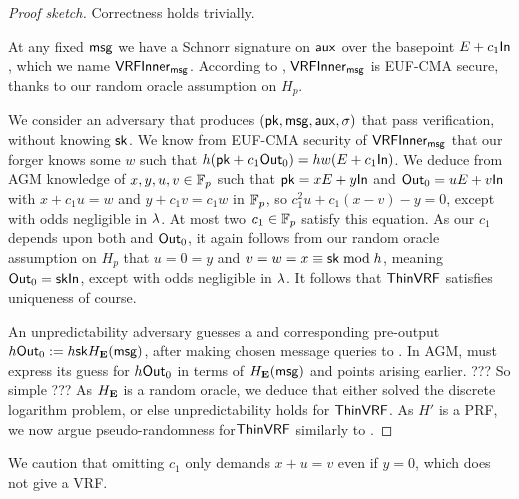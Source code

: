 \begin{proof}[Proof sketch]
Correctness holds trivially.

At any fixed $\mathsf{msg}$ we have a Schnorr signature on $\mathsf{aux}$
 over the basepoint $E + c_1 {\mathsf{In}}$, which we name ${\mathsf{VRFInner}}_{\mathsf{msg}}$.
According to \cite[\S5]{cryptoeprint:2020:823},
 ${\mathsf{VRFInner}}_{\mathsf{msg}}$ is EUF-CMA secure,
 thanks to our random oracle assumption on $H_p$.

We consider an adversary that produces $(\mathsf{pk},\mathsf{msg},\mathsf{aux},\sigma)$
 that pass verification, without knowing $\mathsf{sk}$.  
We know from EUF-CMA security of ${\mathsf{VRFInner}}_{\mathsf{msg}}$ that
our forger knows some $w$ such that
 $h (\mathsf{pk} + c_1 {\mathsf{Out}}_0) = h w (E + c_1 {\mathsf{In}})$.
We deduce from AGM knowledge of $x,y,u,v \in \mathbb{F}_p$ such that
 $\mathsf{pk} = x E + y {\mathsf{In}}$ and ${\mathsf{Out}}_0 = u E + v {\mathsf{In}}$
 with $x + c_1 u = w$ and $y + c_1 v = c_1 w$ in $\mathbb{F}_p$,
 so $c_1^2 u + c_1 (x-v) - y = 0$, except with odds negligible in $\lambda$.
At most two $c_1 \in \mathbb{F}_p$ satisfy this equation.
As our $c_1$ depends upon both \pk and ${\mathsf{Out}}_0$, 
it again follows from our random oracle assumption on $H_p$ that
 $u=0=y$ and $v = w = x \equiv \mathsf{sk} \bmod h$, meaning ${\mathsf{Out}}_0 = \mathsf{sk} {\mathsf{In}}$,
 except with odds negligible in $\lambda$.
It follows that ${\mathsf{ThinVRF}}$ satisfies uniqueness of course. 

An unpredictability adversary \adv guesses
 a \msg and corresponding pre-output $h {\mathsf{Out}}_0 := h \mathsf{sk} H_{\mathbf{E}}(\mathsf{msg})$,
after making chosen message queries to \Sign.
In AGM, \adv must express its guess for $h {\mathsf{Out}}_0$
 in terms of $H_{\mathbf{E}}(\mathsf{msg})$ and points arising earlier.
???  So simple ???
As $H_{\mathbf{E}}$ is a random oracle, we deduce that either
 \adv solved the discrete logarithm problem, or else
 unpredictability holds for ${\mathsf{ThinVRF}}$.
As $H'$ is a PRF, we now argue pseudo-randomness for${\mathsf{ThinVRF}}$ similarly
 to \cite[Proposition 1]{vrf_micali}.
\end{proof}

We caution that omitting $c_1$ only demands $x + u = v$ even if $y=0$,
which does not give a VRF.





\endinput



